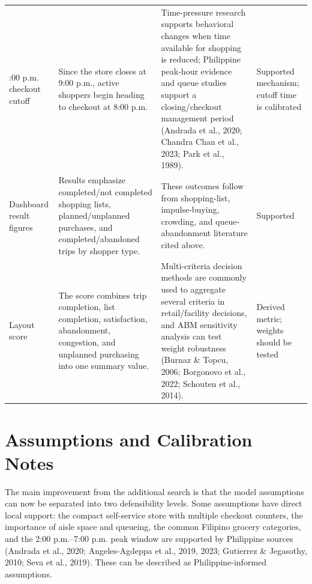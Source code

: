 \documentclass[12pt]{article}
\begin{document}
\begin{longtable}{>{\raggedright\arraybackslash}p{} >{\raggedright\arraybackslash}p{} >{\raggedright\arraybackslash}p{} >{\raggedright\arraybackslash}p{}}
8:00 p.m. checkout cutoff & Since the store closes at 9:00 p.m., active shoppers begin heading to checkout at 8:00 p.m. & Time-pressure research supports behavioral changes when time available for shopping is reduced; Philippine peak-hour evidence and queue studies support a closing/checkout management period (Andrada et al., 2020; Chandra Chan et al., 2023; Park et al., 1989). & Supported mechanism; cutoff time is calibrated \\

Dashboard result figures & Results emphasize completed/not completed shopping lists, planned/unplanned purchases, and completed/abandoned trips by shopper type. & These outcomes follow from shopping-list, impulse-buying, crowding, and queue-abandonment literature cited above. & Supported \\

Layout score & The score combines trip completion, list completion, satisfaction, abandonment, congestion, and unplanned purchasing into one summary value. & Multi-criteria decision methods are commonly used to aggregate several criteria in retail/facility decisions, and ABM sensitivity analysis can test weight robustness (Burnaz \& Topcu, 2006; Borgonovo et al., 2022; Schouten et al., 2014). & Derived metric; weights should be tested \\

\bottomrule
\end{longtable}
\endgroup
\normalsize

\section{Assumptions and Calibration Notes}

The main improvement from the additional search is that the model assumptions can now be separated into two defensibility levels. Some assumptions have direct local support: the compact self-service store with multiple checkout counters, the importance of aisle space and queueing, the common Filipino grocery categories, and the 2:00 p.m.--7:00 p.m. peak window are supported by Philippine sources (Andrada et al., 2020; Angeles-Agdeppa et al., 2019, 2023; Gutierrez \& Jegasothy, 2010; Seva et al., 2019). These can be described as Philippine-informed assumptions.
\end{document}
